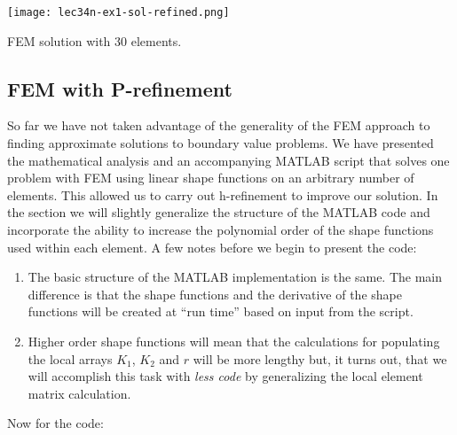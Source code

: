 \begin{marginfigure}[1.0cm]
\texttt{[image: lec34n-ex1-sol-refined.png]}
\caption{FEM solution with 30 elements.}
\label{fig:lec34n-ex1-sol-refined}
\end{marginfigure}


\subsection{FEM with P-refinement}
So far we have not taken advantage of the generality of the FEM approach to finding approximate solutions to boundary value problems.  We have presented the mathematical analysis and an accompanying MATLAB script that solves one problem with FEM using linear shape functions on an arbitrary number of elements.  This allowed us to carry out h-refinement to improve our solution.  In the section we will slightly generalize the structure of the MATLAB code and incorporate the ability to increase the polynomial order of the shape functions used within each element.  A few notes before we begin to present the code:
\begin{enumerate}
\item The basic structure of the MATLAB implementation is the same.  The main difference is that the shape functions and the derivative of the shape functions will be created at ``run time'' based on input from the script.  

\item Higher order shape functions will mean that the calculations for populating the local arrays $K_1$, $K_2$ and $r$ will be more lengthy but, it turns out, that we will accomplish this task with \emph{less code} by generalizing the local element matrix calculation.
\end{enumerate}
Now for the code:
\setcounter{lstannotation}{0}
